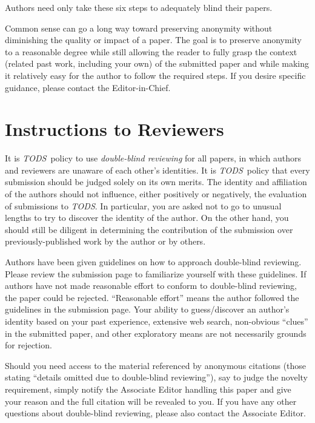 \documentclass[acmtods,acmnow]{acmtrans2m}
\newcommand{\tods}{{\em TODS\/}}
\begin{document}
\noindent
Authors need only take these six steps to adequately blind their papers.

Common sense can go a long way toward preserving
anonymity without diminishing the quality or impact of a paper. The goal is
to preserve anonymity to a reasonable degree while still allowing the reader
to fully grasp the context (related past work, including your own) of the
submitted paper and while making it relatively easy for the author to follow
the required steps. If you desire specific guidance, please contact the
Editor-in-Chief.

\section{Instructions to Reviewers}\label{app:reviewers}

It is \tods\ policy to use {\em double-blind reviewing} for all papers, in
which authors and reviewers are unaware of each other's identities.
It is \tods\ policy that every submission should be judged solely
on its own merits. The identity and affiliation of the authors should not
influence, either positively or negatively, the evaluation of submissions to
\tods. In particular, you are asked not to go
to unusual lengths to try to discover the identity of the author. On the
other hand, you should still be diligent in determining the contribution of
the submission over previously-published work by the author or by others.

Authors have been given guidelines on how to approach double-blind
reviewing. Please review the submission page to familiarize yourself with
these guidelines. If authors have not made reasonable effort to conform to
double-blind reviewing, the paper could be rejected.  ``Reasonable effort''
means the author followed the guidelines in the submission page. Your
ability to guess/discover an author's identity based on your past
experience, extensive web search, non-obvious ``clues'' in the submitted
paper, and other exploratory means are not necessarily grounds for
rejection.

Should you need access to the material referenced by anonymous citations
(those stating ``details omitted due to double-blind reviewing''), say to
judge the novelty requirement, simply notify the Associate Editor handling
this paper and give your reason and the full citation will be revealed to
you. If you have any other questions about double-blind reviewing, please
also contact the Associate Editor.
\end{document}
